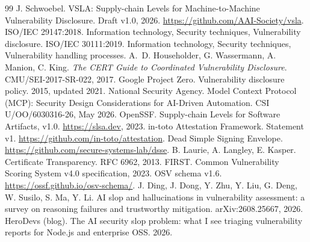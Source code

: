 \documentclass[11pt]{article}
\begin{document}
\begin{thebibliography}{99}\small
{} J. Schwoebel. VSLA: Supply-chain Levels for Machine-to-Machine Vulnerability Disclosure. Draft v1.0, 2026. \url{https://github.com/AAI-Society/vsla}.
 ISO/IEC 29147:2018. Information technology, Security techniques, Vulnerability disclosure.
 ISO/IEC 30111:2019. Information technology, Security techniques, Vulnerability handling processes.
 A.~D. Householder, G. Wassermann, A. Manion, C. King. \emph{The CERT Guide to Coordinated Vulnerability Disclosure}. CMU/SEI-2017-SR-022, 2017.
 Google Project Zero. Vulnerability disclosure policy. 2015, updated 2021.
 National Security Agency. Model Context Protocol (MCP): Security Design Considerations for AI-Driven Automation. CSI U/OO/6030316-26, May 2026.
 OpenSSF. Supply-chain Levels for Software Artifacts, v1.0. \url{https://slsa.dev}, 2023.
 in-toto Attestation Framework. Statement v1. \url{https://github.com/in-toto/attestation}.
 Dead Simple Signing Envelope. \url{https://github.com/secure-systems-lab/dsse}.
 B. Laurie, A. Langley, E. Kasper. Certificate Transparency. RFC 6962, 2013.
 FIRST. Common Vulnerability Scoring System v4.0 specification, 2023.
 OSV schema v1.6. \url{https://ossf.github.io/osv-schema/}.
 J. Ding, J. Dong, Y. Zhu, Y. Liu, G. Deng, W. Susilo, S. Ma, Y. Li. AI slop and hallucinations in vulnerability assessment: a survey on reasoning failures and trustworthy mitigation. arXiv:2608.25667, 2026.
 HeroDevs (blog). The AI security slop problem: what I see triaging vulnerability reports for Node.js and enterprise OSS. 2026.
\end{thebibliography}
\end{document}
